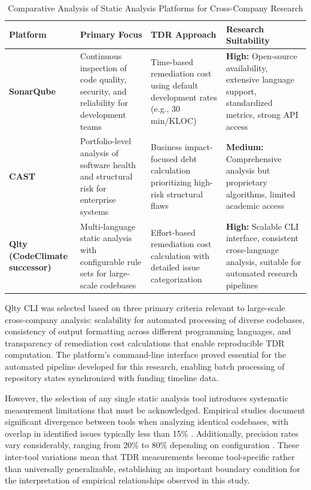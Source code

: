 \begin{table}[htbp]
\centering
\caption{Comparative Analysis of Static Analysis Platforms for Cross-Company Research}
\label{tab:static_analysis_methodology}
\begin{tabular}{|p{2.8cm}|p{3.8cm}|p{3.5cm}|p{4.4cm}|}
\hline
\textbf{Platform} & \textbf{Primary Focus} & \textbf{TDR Approach} & \textbf{Research Suitability} \\
\hline
\textbf{SonarQube} & 
Continuous inspection of code quality, security, and reliability for development teams & 
Time-based remediation cost using default development rates (e.g., 30 min/KLOC) & 
\textbf{High:} Open-source availability, extensive language support, standardized metrics, strong API access \\
\hline
\textbf{CAST} & 
Portfolio-level analysis of software health and structural risk for enterprise systems & 
Business impact-focused debt calculation prioritizing high-risk structural flaws & 
\textbf{Medium:} Comprehensive analysis but proprietary algorithms, limited academic access \\
\hline
\textbf{Qlty (CodeClimate successor)} & 
Multi-language static analysis with configurable rule sets for large-scale codebases & 
Effort-based remediation cost calculation with detailed issue categorization & 
\textbf{High:} Scalable CLI interface, consistent cross-language analysis, suitable for automated research pipelines \\
\hline
\end{tabular}
\end{table}

Qlty CLI was selected based on three primary criteria relevant to large-scale cross-company analysis: scalability for automated processing of diverse codebases, consistency of output formatting across different programming languages, and transparency of remediation cost calculations that enable reproducible \ac{TDR} computation. The platform's command-line interface proved essential for the automated pipeline developed for this research, enabling batch processing of repository states synchronized with funding timeline data.

However, the selection of any single static analysis tool introduces systematic measurement limitations that must be acknowledged. Empirical studies document significant divergence between tools when analyzing identical codebases, with overlap in identified issues typically less than 15\% \citep{wang2018comprehensive}. Additionally, precision rates vary considerably, ranging from 20\% to 80\% depending on configuration \citep{beller2016analyzing}. These inter-tool variations mean that \ac{TDR} measurements become tool-specific rather than universally generalizable, establishing an important boundary condition for the interpretation of empirical relationships observed in this study.

